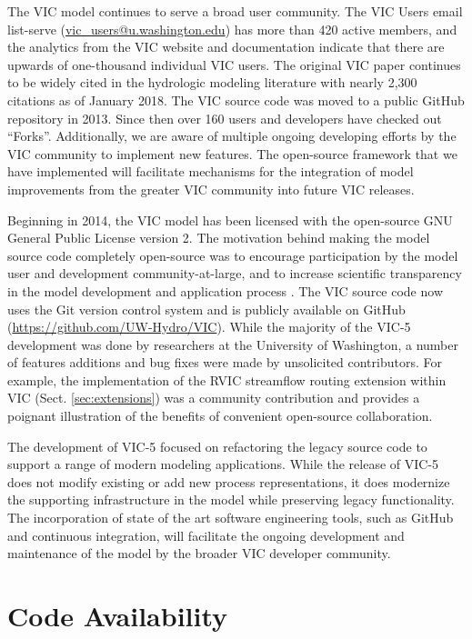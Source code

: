 \documentclass[gmd, manuscript]{copernicus}
\begin{document}
\conclusions[Conclusions]
\label{sec:conclusions}

  The VIC model continues to serve a broad user community. The VIC Users email list-serve (\url{vic_users@u.washington.edu}) has more than 420 active members, and the analytics from the VIC website and documentation indicate that there are upwards of one-thousand individual VIC users. The original VIC paper \citep{Liang_1994} continues to be widely cited in the hydrologic modeling literature with nearly 2,300 citations as of January 2018. The VIC source code was moved to a public GitHub repository in 2013. Since then over 160 users and developers have checked out ``Forks''. Additionally, we are aware of multiple ongoing developing efforts by the VIC community to implement new features. The open-source framework that we have implemented will facilitate mechanisms for the integration of model improvements from the greater VIC community into future VIC releases.

  Beginning in 2014, the VIC model has been licensed with the open-source GNU General Public License version 2. The motivation behind making the model source code completely open-source was to encourage participation by the model user and development community-at-large, and to increase scientific transparency in the model development and application process \citep{Ince_2012}. The VIC source code now uses the Git version control system \citep{Torvalds_2010} and is publicly available on GitHub (\url{https://github.com/UW-Hydro/VIC}). While the majority of the VIC-5 development was done by researchers at the University of Washington, a number of features additions and bug fixes were made by unsolicited contributors. For example, the implementation of the RVIC streamflow routing extension within VIC (Sect. \ref{sec:extensions}) was a community contribution and provides a poignant illustration of the benefits of convenient open-source collaboration.

  The development of VIC-5 focused on refactoring the legacy source code to support a range of modern modeling applications. While the release of VIC-5 does not modify existing or add new process representations, it does modernize the supporting infrastructure in the model while preserving legacy functionality. The incorporation of state of the art software engineering tools, such as GitHub and continuous integration, will facilitate the ongoing development and maintenance of the model by the broader VIC developer community.

\section{Code Availability}
\label{appendix:code_avail}
\end{document}
